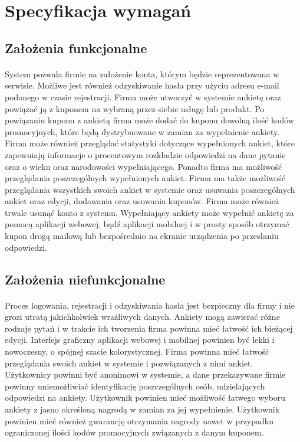 \section{Specyfikacja wymagań}
\subsection{Założenia funkcjonalne}
\paragraph{}
System pozwala firmie na założenie konta, którym będzie reprezentowana w serwisie. Możliwe jest również odzyskiwanie hasła przy użyciu adresu e-mail podanego w czasie rejestracji. Firma może utworzyć w systemie ankietę oraz powiązać ją z kuponem na wybraną przez siebie usługę lub produkt. Po powiązaniu kuponu z ankietą firma może dodać do kuponu dowolną ilość kodów promocyjnych, które będą dystrybuowane w zamian za wypełnienie ankiety. Firma może również przeglądać statystyki dotyczące wypełnionych ankiet, które zapewniają informacje o procentowym rozkładzie odpowiedzi na dane pytanie oraz o wieku oraz narodowości wypełniającego. Ponadto firma ma możliwość przeglądania poszczególnych wypełnionych ankiet. Firma ma także możliwość przeglądania wszystkich swoich ankiet w systemie oraz usuwania poszczególnych ankiet oraz edycji, dodawania oraz usuwania kuponów. Firma może również trwale usunąć konto z systemu. Wypełniający ankiety może wypełnić ankietę za pomocą aplikacji webowej, bądź aplikacji mobilnej i w prosty sposób otrzymać kupon drogą mailową lub bezpośrednio na ekranie urządzenia po przesłaniu odpowiedzi.

\subsection{Założenia niefunkcjonalne}
\paragraph{}
Proces logowania, rejestracji i odzyskiwania hasła jest bezpieczny dla firmy i nie grozi utratą jakichkolwiek wrażliwych danych. Ankiety mogą zawierać różne rodzaje pytań i w trakcie ich tworzenia firma powinna mieć łatwość ich bieżącej edycji. Interfejs graficzny aplikacji webowej i mobilnej powinien być lekki i nowoczesny, o spójnej szacie kolorystycznej. Firma powinna mieć łatwość przeglądania swoich ankiet w systemie i pozwiązanych z nimi ankiet. Użytkownicy powinni być anonimowi w systemie, a dane przekazywane firmie powinny uniemożliwiać identyfikację poszczególnych osób, udzielających odpowiedzi na ankiety. Użytkownik powinien mieć możliwość łatwego wyboru ankiety z jasno określoną nagrodą w zamian za jej wypełnienie. Użytkownik powinien mieć również gwarancję otrzymania nagrody nawet w przypadku ograniczonej ilości kodów promocyjnych związanych z danym kuponem.

